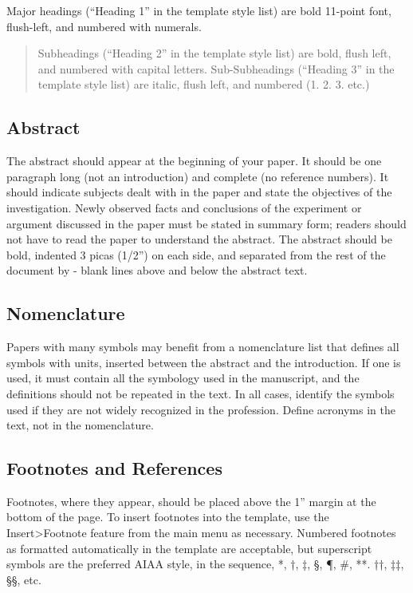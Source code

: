 Major headings (``Heading 1'' in the template style list) are bold
11-point font, flush-left, and numbered with numerals.

\begin{quote}
Subheadings (``Heading 2'' in the template style list) are bold, flush
left, and numbered with capital letters. Sub-Subheadings (``Heading 3''
in the template style list) are italic, flush left, and numbered (1. 2.
3. etc.)
\end{quote}

\subsection{Abstract}\label{abstract}

The abstract should appear at the beginning of your paper. It should be
one paragraph long (not an introduction) and complete (no reference
numbers). It should indicate subjects dealt with in the paper and state
the objectives of the investigation. Newly observed facts and
conclusions of the experiment or argument discussed in the paper must be
stated in summary form; readers should not have to read the paper to
understand the abstract. The abstract should be bold, indented 3 picas
(1/2'') on each side, and separated from the rest of the document by -
blank lines above and below the abstract text.

\subsection{Nomenclature}\label{nomenclature}

Papers with many symbols may benefit from a nomenclature list that
defines all symbols with units, inserted between the abstract and the
introduction. If one is used, it must contain all the symbology used in
the manuscript, and the definitions should not be repeated in the text.
In all cases, identify the symbols used if they are not widely
recognized in the profession. Define acronyms in the text, not in the
nomenclature.

\subsection{Footnotes and References}\label{footnotes-and-references}

Footnotes, where they appear, should be placed above the 1'' margin at
the bottom of the page. To insert footnotes into the template, use the
Insert\textgreater Footnote feature from the main menu as necessary.
Numbered footnotes as formatted automatically in the template are
acceptable, but superscript symbols are the preferred AIAA style, in the
sequence, *, †, ‡, §, ¶, \#, **. ††, ‡‡, §§, etc.

